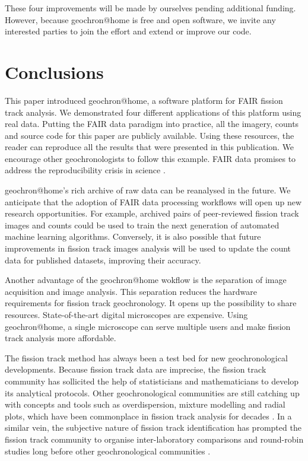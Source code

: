 \documentclass[gchron, manuscript]{copernicus}
\begin{document}
These four improvements will be made by ourselves pending additional
funding. However, because geochron@home is free and open software, we
invite any interested parties to join the effort and extend or improve
our code.

\section{Conclusions}\label{sec:conclusions}

This paper introduced geochron@home, a software platform for FAIR
fission track analysis. We demonstrated four different applications of
this platform using real data. Putting the FAIR data paradigm into
practice, all the imagery, counts and source code for this paper are
publicly available. Using these resources, the reader can reproduce
all the results that were presented in this publication.  We encourage
other geochronologists to follow this example.  FAIR data promises to
address the reproducibility crisis in science
\citep{miyakawa2020}.\medskip

geochron@home's rich archive of raw data can be reanalysed in
the future. We anticipate that the adoption of FAIR data processing
workflows will open up new research opportunities. For example,
archived pairs of peer-reviewed fission track images and counts could
be used to train the next generation of automated machine learning
algorithms. Conversely, it is also possible that future improvements
in fission track images analysis will be used to update the count data
for published datasets, improving their accuracy.\medskip

Another advantage of the geochron@home wokflow is the separation of
image acquisition and image analysis. This separation reduces the
hardware requirements for fission track geochronology. It opens up the
possibility to share resources. State-of-the-art digital microscopes
are expensive. Using geochron@home, a single microscope can serve
multiple users and make fission track analysis more
affordable.\medskip

The fission track method has always been a test bed for new
geochronological developments.  Because fission track data are
imprecise, the fission track community has sollicited the help of
statisticians and mathematicians to develop its analytical protocols.
Other geochronological communities are still catching up with concepts
and tools such as overdispersion, mixture modelling and radial plots,
which have been commonplace in fission track analysis for decades
\citep{vermeesch2019b}. In a similar vein, the subjective nature of
fission track identification has prompted the fission track community
to organise inter-laboratory comparisons and round-robin studies long
before other geochronological communities
\citep{miller1985,tamer2025}.\medskip
\end{document}
